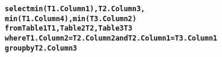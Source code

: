 \begin{figure}[t]
\begin{CodeOut}
\begin{alltt}
\textbf{select min(T1.Column1), T2.Column3,
       min(T1.Column4), min(T3.Column2)
from Table1 T1, Table2 T2, Table3 T3
where T1.Column2 = T2.Column2 and T2.Column1 = T3.Column1
group by T2.Column3}
\end{alltt}
\end{CodeOut}
\vspace{-5mm}
\end{figure}
